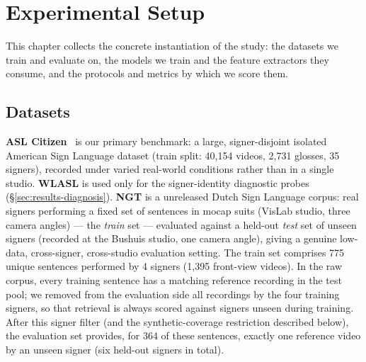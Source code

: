 \chapter{Experimental Setup}
\label{chap:setup}
This chapter collects the concrete instantiation of the study: the
datasets we train and evaluate on, the models we train and the feature
extractors they consume, and the protocols and metrics by which we score
them. 

\section{Datasets}
\textbf{ASL Citizen}~\cite{aslcitizen} is our primary benchmark: a
large, signer-disjoint isolated American Sign Language dataset (train split:
40{,}154 videos, 2{,}731 glosses, 35 signers), recorded under varied
real-world conditions rather than in a single studio.
\textbf{WLASL} is used only for the signer-identity diagnostic probes
(\S\ref{sec:results-diagnosis}). \textbf{NGT} is a unreleased Dutch Sign
Language corpus: real signers performing
a fixed set of sentences in mocap suits (VisLab studio, three camera
angles) --- the \emph{train} set --- evaluated against a held-out \emph{test}
set of unseen signers (recorded at the Bushuis studio, one camera angle),
giving a genuine low-data, cross-signer,
cross-studio evaluation setting. The train set comprises 775 unique
sentences performed by 4 signers (1{,}395 front-view videos). In the raw
corpus, every training sentence has a matching reference recording in
the test pool; we removed from the evaluation side all recordings by the
four training signers, so that retrieval is always scored against
signers unseen during training. After this signer filter (and the
synthetic-coverage restriction described below), the evaluation set
provides, for 364 of these sentences, exactly one reference video by an
unseen signer (six held-out signers in total).

